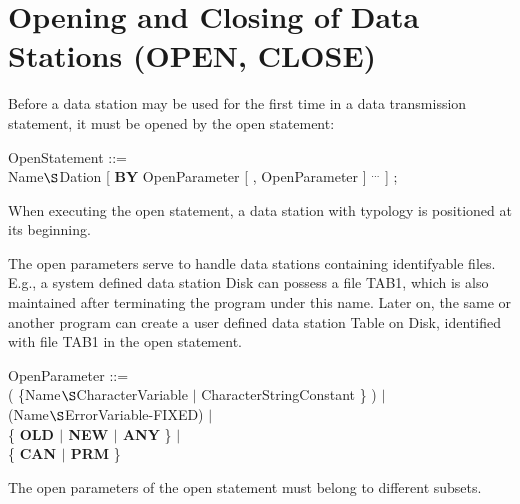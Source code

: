 \section{Opening and Closing of Data Stations (OPEN, CLOSE)}   %
\label{sec_open_close}

Before a data station may be used for the first time in a data
transmission statement, it must be opened by the open statement:

OpenStatement ::=\\
 Name$\S $Dation [ {\bf BY} OpenParameter [ , OpenParameter ] $^{...}$ ] ;

When executing the open statement, a data station with typology is
positioned at its beginning.

The open parameters serve to handle data stations containing
identifyable files. E.g., a system defined data station Disk can possess
a file TAB1, which is also maintained after terminating the program
under this name. Later on, the same or another program can create a user
defined data station Table on Disk, identified with file TAB1 in the
open statement.

OpenParameter ::=\\
 ( \{Name$\S $CharacterVariable $\mid$ CharacterStringConstant \} ) $\mid$\\
 (Name$\S $ErrorVariable-FIXED) $\mid$ \\
\x \{ {\bf OLD $\mid$ NEW $\mid$ ANY} \} $\mid$ \\
\x \{ {\bf CAN $\mid$ PRM} \}

The open parameters of the open statement must belong to different
subsets.


